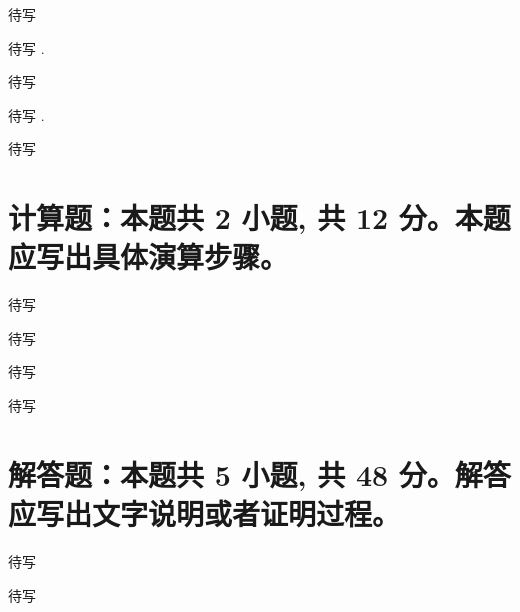 \begin{solution}
  待写
\end{solution}

\begin{question}
  待写 \fillin[].
\end{question}

\begin{solution}
  待写
\end{solution}

\begin{question}
  待写 \fillin[].
\end{question}

\begin{solution}
  待写
\end{solution}


\section{计算题：本题共 2 小题, 共 12 分。本题应写出具体演算步骤。}


\begin{question}[points = 6]
  待写

\end{question}

\begin{solution}
  待写
\end{solution}

\begin{question}[points = 6]
  待写

\end{question}

\begin{solution}
  待写
\end{solution}


\section{解答题：本题共 5 小题, 共 48 分。解答应写出文字说明或者证明过程。}


\begin{question}[points = 6]
  待写

\end{question}

\begin{solution}
  待写
\end{solution}

